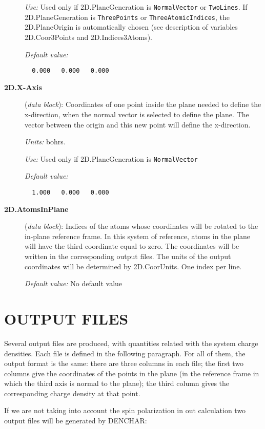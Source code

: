 \begin{description}
{\it Use:} Used only if 2D.PlaneGeneration is {\tt NormalVector} or
{\tt TwoLines}. If 2D.PlaneGeneration is {\tt ThreePoints}
or {\tt ThreeAtomicIndices}, the 2D.PlaneOrigin is
automatically chosen (see description of variables 2D.Coor3Points
and 2D.Indices3Atoms).
    
{\it Default value:} 
\begin{verbatim}
  0.000   0.000   0.000
\end{verbatim}
        
\item[{\bf 2D.X-Axis}] ({\it data block}): 
Coordinates of one point inside the plane needed to define the x-direction,
when the normal vector is selected to define the plane. The vector between 
the origin and this new point will define the x-direction.

{\it Units:} bohrs.

{\it Use:} Used only if 2D.PlaneGeneration is {\tt NormalVector} 
    
{\it Default value:} 
\begin{verbatim}
  1.000   0.000   0.000
\end{verbatim}

\item[{\bf 2D.AtomsInPlane}] ({\it data block}): 
Indices of the atoms whose coordinates will be rotated to the in-plane 
reference frame. In this system of reference, atoms in the plane will have 
the third coordinate equal to zero. 
The coordinates will be written in the corresponding output files. The
units of the output coordinates will be determined by 2D.CoorUnits.
One index per line.

{\it Default value:} No default value 

\end{description}

\section{OUTPUT FILES}

Several output files are produced, with quantities related
with the system charge densities.
Each file is defined in the following paragraph.
For all of them, the output format is the same: there are three 
columns in each file; the first two columns give the coordinates of the points
in the plane (in the reference frame in which the third axis is normal  
to the plane);
the third column gives the corresponding charge density at that
point.

If we are not taking into account the spin polarization in out calculation 
two output files will be generated by DENCHAR:

